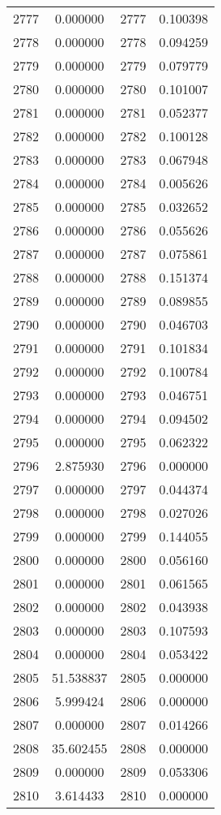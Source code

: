 \documentclass[12pt]{article}
\begin{document}
\begin{longtable}{@{}cccc@{}}
2777 & 0.000000 & 2777 & 0.100398 \\
2778 & 0.000000 & 2778 & 0.094259 \\
2779 & 0.000000 & 2779 & 0.079779 \\
2780 & 0.000000 & 2780 & 0.101007 \\
2781 & 0.000000 & 2781 & 0.052377 \\
2782 & 0.000000 & 2782 & 0.100128 \\
2783 & 0.000000 & 2783 & 0.067948 \\
2784 & 0.000000 & 2784 & 0.005626 \\
2785 & 0.000000 & 2785 & 0.032652 \\
2786 & 0.000000 & 2786 & 0.055626 \\
2787 & 0.000000 & 2787 & 0.075861 \\
2788 & 0.000000 & 2788 & 0.151374 \\
2789 & 0.000000 & 2789 & 0.089855 \\
2790 & 0.000000 & 2790 & 0.046703 \\
2791 & 0.000000 & 2791 & 0.101834 \\
2792 & 0.000000 & 2792 & 0.100784 \\
2793 & 0.000000 & 2793 & 0.046751 \\
2794 & 0.000000 & 2794 & 0.094502 \\
2795 & 0.000000 & 2795 & 0.062322 \\
2796 & 2.875930 & 2796 & 0.000000 \\
2797 & 0.000000 & 2797 & 0.044374 \\
2798 & 0.000000 & 2798 & 0.027026 \\
2799 & 0.000000 & 2799 & 0.144055 \\
2800 & 0.000000 & 2800 & 0.056160 \\
2801 & 0.000000 & 2801 & 0.061565 \\
2802 & 0.000000 & 2802 & 0.043938 \\
2803 & 0.000000 & 2803 & 0.107593 \\
2804 & 0.000000 & 2804 & 0.053422 \\
2805 & 51.538837 & 2805 & 0.000000 \\
2806 & 5.999424 & 2806 & 0.000000 \\
2807 & 0.000000 & 2807 & 0.014266 \\
2808 & 35.602455 & 2808 & 0.000000 \\
2809 & 0.000000 & 2809 & 0.053306 \\
2810 & 3.614433 & 2810 & 0.000000 \\

\end{longtable}
\end{document}
